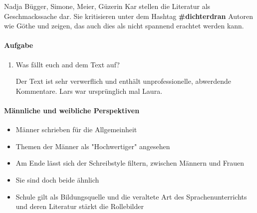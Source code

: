 \documentclass{article}
\begin{document}
Nadja Bügger, Simone, Meier, Güzerin Kar stellen die Literatur als Geschmackssache dar. Sie kritisieren unter dem Hashtag \textbf{\#dichterdran} Autoren wie Göthe und zeigen, das auch dies als nicht spannend erachtet werden kann.

\paragraph{Aufgabe}
\begin{enumerate}
    \item Was fällt euch and dem Text auf?

    Der Text ist sehr verwerflich und enthält unprofessionelle, abwerdende Kommentare. Lars war ursprünglich mal Laura.
\end{enumerate}

\paragraph{Männliche und weibliche Perspektiven}
\begin{itemize}
    \item Männer schrieben für die Allgemeinheit
    \item Themen der Männer als "Hochwertiger" angesehen
    \item Am Ende lässt sich der Schreibstyle filtern, zwischen Männern und Frauen
    \item Sie sind doch beide ähnlich
    \item Schule gilt als Bildungsquelle und die veraltete Art des Sprachenunterrichts und deren Literatur stärkt die Rollebilder
\end{itemize}


\end{document}
